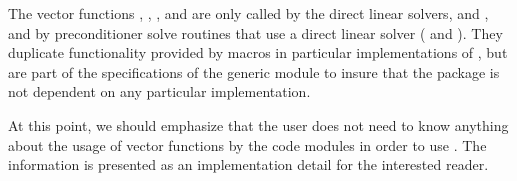 The vector functions , , , and
 are only called by the {\cvode} direct linear solvers, 
{\cvdense} and {\cvband}, and by preconditioner solve routines that use a 
direct linear solver ({\cvbandpre}  and {\cvbbdpre}). They duplicate 
functionality provided by macros in particular implementations of {\nvector},
but are part of the specifications of the generic {\nvector} module to insure 
that the {\cvode} package is not dependent on any particular {\nvector} implementation.

At this point, we should emphasize that the {\cvode} user does not need to know 
anything about the usage of vector functions by the {\cvode} code modules in order 
to use {\cvode}. The information is presented as an implementation detail for the 
interested reader.


